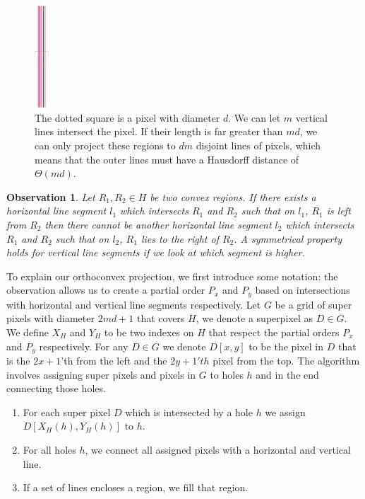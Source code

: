 \documentclass[a4paper, UKenglish]{lipics-v2018}
\newtheorem{observation}{Observation}
\begin{document}
\begin{figure}[H]
\centering
\includegraphics[width=20px]{Figures/linesexample.png}
\caption{The dotted square is a pixel with diameter $d$. We can let $m$ vertical lines intersect the pixel. If their length is far greater than $md$, we can only project these regions to $dm$ disjoint lines of pixels, which means that the outer lines must have a Hausdorff distance of $\Theta(md)$.}
\label{fig:linesexample}
\end{figure}


\begin{observation}
Let $R_1,R_2 \in H$ be two convex regions. If there exists a horizontal line segment $l_1$ which intersects $R_1$ and $R_2$ such that on $l_1$, $R_1$ is left from $R_2$ then there cannot be another horizontal line segment $l_2$ which intersects $R_1$ and $R_2$ such that on $l_2$, $R_1$ lies to the right of $R_2$. A symmetrical property holds for vertical line segments if we look at which segment is higher.
\end{observation}

To explain our orthoconvex projection, we first introduce some notation: the observation allows us to create a partial order $P_x$ and $P_y$ based on intersections with horizontal and vertical line segments respectively. Let $G$ be a grid of super pixels with diameter $2md+1$ that covers $H$, we denote a superpixel as $D \in G$. We define $X_H$ and $Y_H$ to be two indexes on $H$ that respect the partial orders $P_x$ and $P_y$ respectively. For any $D \in G$ we denote $D[x,y]$ to be the pixel in $D$ that is the $2x+1$'th from the left and the $2y+1'th$ pixel from the top. The algorithm involves assigning super pixels and pixels in $G$ to holes $h$ and in the end connecting those holes.

\begin{enumerate}
\item For each super pixel $D$ which is intersected by a hole $h$ we assign $D[X_H(h), Y_H(h)]$ to $h$.
\item For all holes $h$, we connect all assigned pixels with a horizontal and vertical line. 
\item If a set of lines encloses a region, we fill that region.
\end{enumerate}
\end{document}
